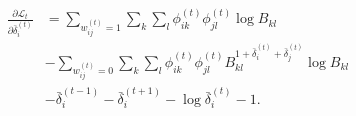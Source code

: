 

\begin{align}
\frac{\partial \mathscr{L}_t}{\partial \bar{\delta}_i^{(t)}} & =\sum_{w_{ij}^{(t)}=1} \sum_k \sum_l \phi_{ik}^{(t)}\phi_{jl}^{(t)} \log B_{kl}  \nonumber\\
& -\sum_{w_{ij}^{(t)}=0} \sum_k \sum_l \phi_{ik}^{(t)}\phi_{jl}^{(t)}  B_{kl}^{1+\bar{\delta}_i^{(t)}+\bar{\delta}_j^{(t)}} \log B_{kl} \nonumber\\
& -\bar{\delta}_i^{(t-1)} - \bar{\delta}_i^{(t+1)} - \log \bar{\delta}_i^{(t)} - 1.
\label{eq:deltat}
\end{align}






